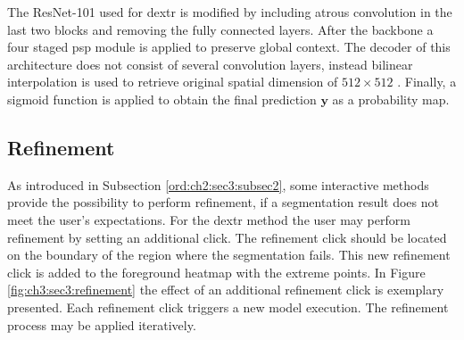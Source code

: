 The ResNet-101 used for \gls{dextr} is modified by including atrous convolution in the last two blocks and removing the fully connected layers.
After the backbone a four staged \gls{psp} module is applied to preserve global context.
The decoder of this architecture does not consist of several convolution layers, instead bilinear interpolation is used to retrieve original spatial dimension of $512 \times 512$ .
Finally, a sigmoid function is applied to obtain the final prediction $\textbf{y}$ as a  probability map.

\subsection{Refinement}\label{ord:ch3:sec3:subsec4}

As introduced in Subsection \ref{ord:ch2:sec3:subsec2}, some interactive methods provide the possibility to perform refinement, if a segmentation result does not meet the user's expectations.
For the \gls{dextr} method the user may perform refinement by setting an additional click.
The refinement click should be located on the boundary of the region where the segmentation fails.
This new refinement click is added to the foreground heatmap with the extreme points.
In Figure \ref{fig:ch3:sec3:refinement} the effect of an additional refinement click is exemplary presented.
Each refinement click triggers a new model execution.
The refinement process may be applied iteratively.

